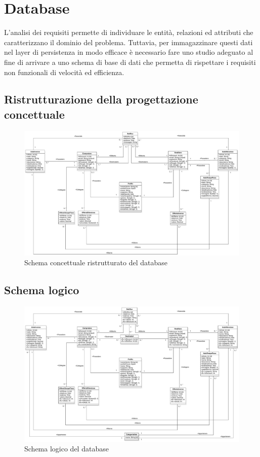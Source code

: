     \clearpage
    
    \section{Database}
        L'analisi dei requisiti permette di individuare le entità, relazioni ed attributi che caratterizzano il dominio del problema. Tuttavia, per immagazzinare questi dati nel layer di persistenza in modo efficace è necessario fare uno studio adeguato al fine di arrivare a uno schema di base di dati che permetta di rispettare i requisiti non funzionali di velocità ed efficienza.
    
        \subsection{Ristrutturazione della progettazione concettuale}
            \begin{figure}[htbp!]
                \centering
                    \includegraphics[width=0.73\linewidth]{Immagini/Diagrammi/Class Diagram/Design/ClassDiagramDatabaseRistrutturato.pdf}
                \caption{Schema concettuale ristrutturato del database}
                \label{fig:Schema concettuale ristrutturato del database}
            \end{figure}
            
        \subsection{Schema logico}
            \begin{figure}[htbp!]
                \centering
                    \includegraphics[width=0.73\linewidth]{Immagini/Diagrammi/Class Diagram/Design/ClassDiagramDatabaseLogico.pdf}
                \caption{Schema logico del database}
                \label{fig:Schema logico del database}
            \end{figure}

